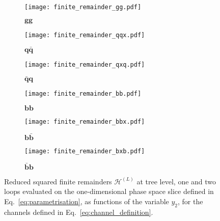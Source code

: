 \documentclass[main.tex]{subfiles}
\begin{document}
\begin{figure}[t!]
\centering
\begin{subfigure}{.5\textwidth}
    \centering
    \texttt{[image: finite\_remainder\_gg.pdf]}
    \label{fig:gg}
    \caption{$\mathbf{gg}$}
\end{subfigure}%
\begin{subfigure}{.5\textwidth}
    \centering
    \texttt{[image: finite\_remainder\_qqx.pdf]}
    \label{fig:qqx}
    \caption{$\mathbf{q\bar{q}}$}
\end{subfigure}
\begin{subfigure}{.5\textwidth}
    \centering
    \texttt{[image: finite\_remainder\_qxq.pdf]}
    \label{fig:qxq}
    \caption{$\mathbf{\bar{q}q}$}
\end{subfigure}%
\begin{subfigure}{.5\textwidth}
    \centering
    \texttt{[image: finite\_remainder\_bb.pdf]}
    \label{fig:bb}
    \caption{$\mathbf{bb}$}
\end{subfigure}
\begin{subfigure}{.5\textwidth}
    \centering
    \texttt{[image: finite\_remainder\_bbx.pdf]}
    \label{fig:bbx}
    \caption{$\mathbf{b\bar{b}}$}
\end{subfigure}%
\begin{subfigure}{.5\textwidth}
    \centering
    \texttt{[image: finite\_remainder\_bxb.pdf]}
    \label{fig:bxb}
    \caption{$\mathbf{\bar{b}b}$}
\end{subfigure}
\caption[short]{Reduced squared finite remainders $\mathcal{H}^{(L)}$ at tree level, one and two loops evaluated on the one-dimensional phase space slice defined 
in Eq.~\ref{eq:parametrisation}, as functions of the variable $y_2$, for the channels defined in Eq.~\ref{eq:channel_definition}.}
\label{fig:plots}
\end{figure}
\end{document}
